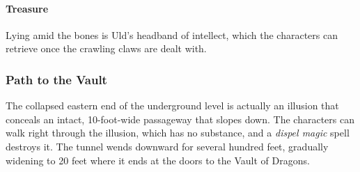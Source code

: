 \documentclass[10pt,a4paper,twoside,twocolumn,openany,nodeprecatedcode]{dndbook}
\begin{document}
\paragraph{Treasure}
Lying amid the bones is Uld's headband of intellect, which the characters can retrieve once the crawling claws are dealt with.
\subsubsection{Path to the Vault}
The collapsed eastern end of the underground level is actually an illusion that conceals an intact, 10-foot-wide passageway that slopes down. The characters can walk right through the illusion, which has no substance, and a \textit{dispel magic} spell destroys it. The tunnel wends downward for several hundred feet, gradually widening to 20 feet where it ends at the doors to the Vault of Dragons.
\end{document}
